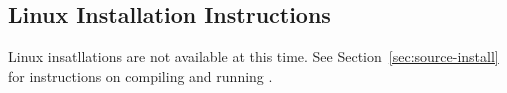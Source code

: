 \subsection{Linux Installation Instructions}
\label{sec:linux-install}

Linux insatllations are not available at this time.  See Section~\ref{sec:source-install} for instructions
on compiling and running \map{}.

